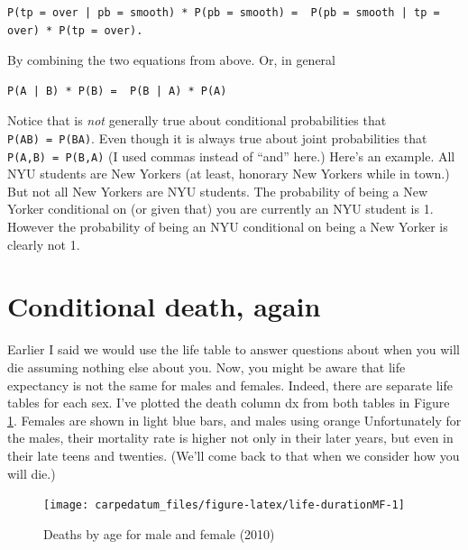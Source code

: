 \documentclass[openany]{book}
\begin{document}
\begin{verbatim}
P(tp = over | pb = smooth) * P(pb = smooth) =  P(pb = smooth | tp = over) * P(tp = over).
\end{verbatim}

By combining the two equations from above. Or, in general

\begin{verbatim}
P(A | B) * P(B) =  P(B | A) * P(A)
\end{verbatim}

Notice that is \emph{not} generally true about conditional probabilities that \texttt{P(A\textbar{}B)\ =\ P(B\textbar{}A)}. Even though it is always true about joint probabilities that \texttt{P(A,B)\ =\ P(B,A)} (I used commas instead of ``and'' here.) Here's an example. All NYU students are New Yorkers (at least, honorary New Yorkers while in town.) But not all New Yorkers are NYU students. The probability of being a New Yorker conditional on (or given that) you are currently an NYU student is 1. However the probability of being an NYU conditional on being a New Yorker is clearly not 1.

\hypertarget{conditional-death-again}{%
\section*{Conditional death, again}\label{conditional-death-again}}

Earlier I said we would use the life table to answer questions about when you will die assuming nothing else about you. Now, you might be aware that life expectancy is not the same for males and females. Indeed, there are separate life tables for each sex. I've plotted the death column dx from both tables in Figure \ref{fig:life-durationMF}. Females are shown in light blue bars, and males using orange Unfortunately for the males, their mortality rate is higher not only in their later years, but even in their late teens and twenties. (We'll come back to that when we consider how you will die.)

\begin{figure}[H]

{\centering \texttt{[image: carpedatum\_files/figure-latex/life-durationMF-1]} 

}

\caption{Deaths by age for male and female (2010)}\label{fig:life-durationMF}
\end{figure}
\end{document}

